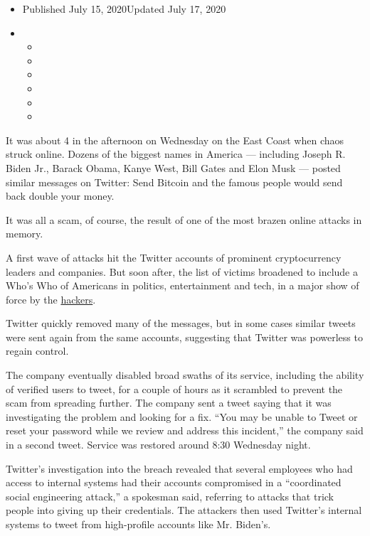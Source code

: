 \begin{itemize}
\item
  Published July 15, 2020Updated July 17, 2020
\item
  \begin{itemize}
  \item
  \item
  \item
  \item
  \item
  \item
  \end{itemize}
\end{itemize}

It was about 4 in the afternoon on Wednesday on the East Coast when
chaos struck online. Dozens of the biggest names in America ---
including Joseph R. Biden Jr., Barack Obama, Kanye West, Bill Gates and
Elon Musk --- posted similar messages on Twitter: Send Bitcoin and the
famous people would send back double your money.

It was all a scam, of course, the result of one of the most brazen
online attacks in memory.

A first wave of attacks hit the Twitter accounts of prominent
cryptocurrency leaders and companies. But soon after, the list of
victims broadened to include a Who's Who of Americans in politics,
entertainment and tech, in a major show of force by the
\href{https://www.nytimes.com/2020/07/17/technology/twitter-hackers-interview.html}{hackers}.

Twitter quickly removed many of the messages, but in some cases similar
tweets were sent again from the same accounts, suggesting that Twitter
was powerless to regain control.

The company eventually disabled broad swaths of its service, including
the ability of verified users to tweet, for a couple of hours as it
scrambled to prevent the scam from spreading further. The company sent a
tweet saying that it was investigating the problem and looking for a
fix. ``You may be unable to Tweet or reset your password while we review
and address this incident,'' the company said in a second tweet. Service
was restored around 8:30 Wednesday night.

Twitter's investigation into the breach revealed that several employees
who had access to internal systems had their accounts compromised in a
``coordinated social engineering attack,'' a spokesman said, referring
to attacks that trick people into giving up their credentials. The
attackers then used Twitter's internal systems to tweet from
high-profile accounts like Mr. Biden's.

